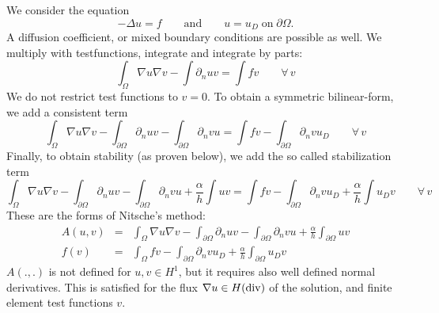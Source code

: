 We consider the equation 
$$
-\Delta u = f \qquad \text{and} \qquad u = u_D \; \text{on}
\; \partial \Omega.
$$
A diffusion coefficient, or mixed boundary conditions are possible as
well. We multiply with testfunctions, integrate and integrate by
parts:
$$
\int_\Omega \nabla u  \nabla v -\int  \partial_n u v = \int f v \qquad \forall \, v  
$$ 
We do not restrict test functions to $v = 0$. To obtain a symmetric
bilinear-form, we add a consistent term
$$
\int_\Omega \nabla u  \nabla v -\int_{\partial \Omega}   \partial_n u v - \int_{\partial \Omega} \partial_n v
u = \int f v  - \int_{\partial \Omega}  \partial_n v u_D \qquad \forall \, v  
$$
Finally, to obtain stability (as proven below), we add the so called
stabilization term
$$
\int_\Omega \nabla u  \nabla v -\int_{\partial \Omega}   \partial_n u v - \int_{\partial \Omega} \partial_n v 
u + \frac{\alpha}{h} \int u v = \int f v  - \int_{\partial 
  \Omega}  \partial_n v u_D   + \frac{\alpha}{h} \int u_D v    \qquad \forall \, v  
$$
These are the forms of Nitsche's method:
\begin{eqnarray*}
A(u,v) & = & \int_\Omega \nabla u  \nabla v -\int_{\partial \Omega}   \partial_n u v - \int_{\partial \Omega} \partial_n v 
u + \frac{\alpha}{h} \int_{\partial \Omega}  u v \\
f(v) & = & \int_\Omega f v  - \int_{\partial 
  \Omega}  \partial_n v u_D   + \frac{\alpha}{h} \int_{\partial \Omega}  u_D v
\end{eqnarray*}
$A(.,.)$ is not defined for $u,v \in H^1$, but it requires also well
defined normal derivatives. This is satisfied for the  flux $\nabla u \in
H(\operatorname{div})$ of the solution, and finite element test functions $v$.

